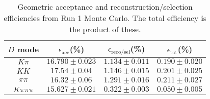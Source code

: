 \begin{table}[H]
    \centering
    \begin{tabular}{cccc}
        \toprule
        $D$ mode & $\epsilon_\mathrm{acc}$(\%) &  $\epsilon_\mathrm{reco/sel}$(\%) &  $\epsilon_\mathrm{tot}$(\%) \\
        \midrule
        $K\pi$ & $16.790 \pm 0.023$ & $1.134 \pm 0.011$ & $0.190 \pm 0.020$ \\
        $KK$ & $17.54 \pm 0.04$ & $1.146 \pm 0.015$ & $0.201 \pm 0.025$ \\
        $\pi\pi$ & $16.32 \pm 0.06$ & $1.291 \pm 0.016$ & $0.211 \pm 0.027$ \\
        $K\pi\pi\pi$ & $15.627 \pm 0.021$ & $0.322 \pm 0.003$ & $0.050 \pm 0.005$ \\
        \bottomrule
    \end{tabular}
    \caption{Geometric acceptance and reconstruction/selection efficiencies from  Run 1 Monte Carlo. The total efficiency is the  product of these.}
\label{tab:selection_efficiency_run1}
\end{table}

